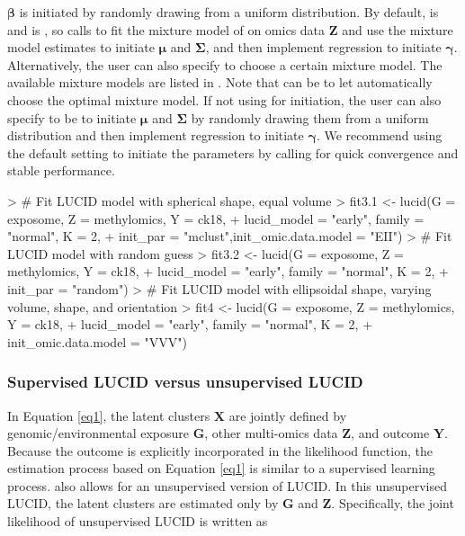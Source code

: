 $\bm \beta$ is initiated by randomly drawing from a uniform distribution. By default,  is  and  is , so  calls  to fit the mixture model of  on omics data $\bm Z$ and use the mixture model estimates to initiate $\bm \mu$ and $\bm \Sigma$, and then implement regression to initiate $\bm \gamma$. Alternatively, the user can also specify  to choose a certain mixture model. The available mixture models are listed in  \citep{scrucca2016mclust}. Note that  can be  to let  automatically choose the optimal mixture model. If not using  for initiation, the user can also specify  to be  to initiate $\bm \mu$ and $\bm \Sigma$ by randomly drawing them from a uniform distribution and then implement regression to initiate $\bm \gamma$. We recommend using the default setting to initiate the parameters by calling  for quick convergence and stable performance.

\begin{example}
> # Fit LUCID model with spherical shape, equal volume
> fit3.1 <- lucid(G = exposome, Z = methylomics, Y = ck18, 
+                 lucid_model = "early", family = "normal", K = 2,
+                 init_par = "mclust",init_omic.data.model = "EII")
> # Fit LUCID model with random guess
> fit3.2 <- lucid(G = exposome, Z = methylomics, Y = ck18, 
+                 lucid_model = "early", family = "normal", K = 2,
+                 init_par = "random")
> # Fit LUCID model with ellipsoidal shape, varying volume, shape, and orientation 
> fit4 <- lucid(G = exposome, Z = methylomics, Y = ck18, 
+               lucid_model = "early", family = "normal", K = 2,
+               init_omic.data.model = "VVV")
\end{example}


\subsubsection{Supervised LUCID versus unsupervised LUCID} \label{sec3.1.2}

In Equation \ref{eq1}, the latent clusters $\bm X$ are jointly defined by genomic/environmental exposure $\bm G$, other multi-omics data $\bm Z$, and outcome $\bm Y$. Because the outcome is explicitly incorporated in the likelihood function, the estimation process based on Equation \ref{eq1} is similar to a supervised learning process.  also allows for an unsupervised version of LUCID. In this unsupervised LUCID, the latent clusters are estimated only by $\bm G$ and $\bm Z$. Specifically, the joint likelihood of unsupervised LUCID is written as

